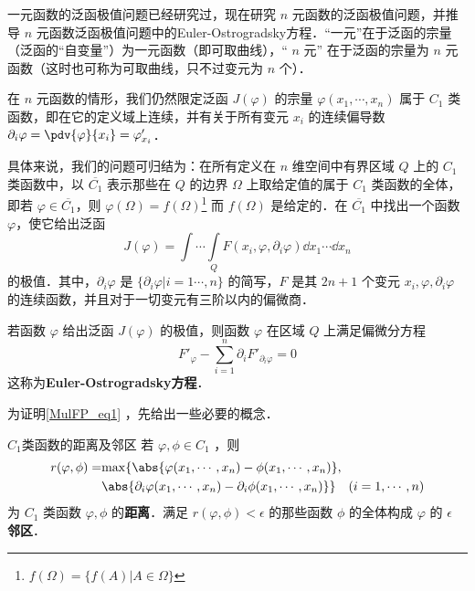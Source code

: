 一元函数的泛函极值问题已经研究过，现在研究 $n$ 元函数的泛函极值问题，并推导 $n$ 元函数泛函极值问题中的Euler-Ostrogradsky方程．“一元”在于泛函的宗量（泛函的“自变量”）为一元函数（即可取曲线），“ $n$ 元” 在于泛函的宗量为 $n$ 元函数（这时也可称为可取曲线，只不过变元为 $n$ 个）．

在 $n$ 元函数的情形，我们仍然限定泛函 $J(\varphi)$ 的宗量 $\varphi(x_1,\cdots,x_n)$ 属于 $C_1$ 类函数，即在它的定义域上连续，并有关于所有变元 $x_i$ 的连续偏导数 $\partial_i\varphi=\pdv{\varphi}{x_i}=\varphi'_{x_i}$．

具体来说，我们的问题可归结为：在所有定义在 $n$ 维空间中有界区域 $Q$ 上的 $C_1$ 类函数中，以 $\overline{C_1}$ 表示那些在 $Q$ 的边界 $\Omega$ 上取给定值的属于 $C_1$ 类函数的全体，即若 $\varphi\in\overline{C_1}$，则 $\varphi(\Omega)=f(\Omega)$\footnote{$f(\Omega)=\{f(A)|A\in \Omega\}$} 而 $f(\Omega)$ 是给定的．在 $\overline{C_1}$ 中找出一个函数 $\varphi$，使它给出泛函
\begin{equation}
J(\varphi)=\int\cdots\int\limits_Q F(x_i,\varphi,\partial_i\varphi)\dd x_1\cdots\dd x_n
\end{equation}
的极值．其中，$\partial_i\varphi$ 是 $\{\partial_i\varphi|i=1\cdots,n\}$ 的简写，$F$ 是其 $2n+1$ 个变元 $x_i,\varphi,\partial_i\varphi$ 的连续函数，并且对于一切变元有三阶以内的偏微商．

若函数 $\varphi$ 给出泛函 $J(\varphi)$ 的极值，则函数 $\varphi$ 在区域 $Q$ 上满足偏微分方程
\begin{equation}\label{MulFP_eq1}
F'_\varphi-\sum_{i=1}^n\partial_i F'_{\partial_i\varphi}=0
\end{equation}
这称为\textbf{Euler-Ostrogradsky方程}．

为证明\autoref{MulFP_eq1} ，先给出一些必要的概念．
\begin{definition}{$C_1$类函数的距离及邻区}
若 $\varphi,\phi\in C_1$ ，则
\begin{equation}
\begin{aligned}
r(\varphi,\phi)=&\mathrm{max}\{\abs{\varphi(x_1,\cdots,x_n)-\phi(x_1,\cdots,x_n)},\\
&\abs{\partial_i\varphi(x_1,\cdots,x_n)-\partial_i\phi(x_1,\cdots,x_n)}\}\quad (i=1,\cdots,n)
\end{aligned}
\end{equation}
为 $C_1$ 类函数 $\varphi,\phi$ 的\textbf{距离}．满足 $r(\varphi,\phi)<\epsilon$ 的那些函数 $\phi$ 的全体构成 $\varphi$ 的 $\epsilon$ \textbf{邻区}． 
\end{definition}

